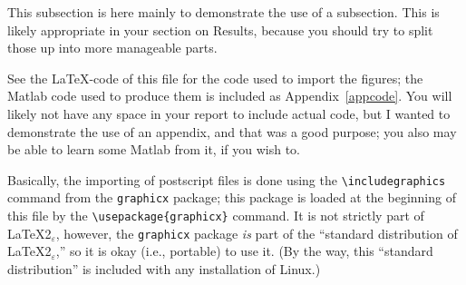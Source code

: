 \documentclass[12pt]{article}
\numberwithin{equation}{section}
\numberwithin{table}{section}
\numberwithin{figure}{section}
\begin{document}
This subsection is here mainly to demonstrate the use of a subsection.
This is likely appropriate in your section on Results, because you should
try to split those up into more manageable parts.

See the \LaTeX-code of this file for the code used to import the figures;
the Matlab code used to produce them is included as Appendix~\ref{appcode}.
You will likely not have any space in your report to include actual code, but
I wanted to demonstrate the use of an appendix, and that was a good purpose;
you also may be able to learn some Matlab from it, if you wish to.

Basically, the importing of postscript files is done using the
\verb+\includegraphics+ command from the \verb+graphicx+ package;
this package is loaded at the beginning of this file by
the \verb+\usepackage{graphicx}+ command.
It is not strictly part of \LaTeX2$_\varepsilon$,
however, the \verb+graphicx+ package \emph{is}
part of the ``standard distribution of \LaTeX2$_\varepsilon$,'' so it is
okay (i.e., portable) to use it. (By the way, this ``standard distribution''
is included with any installation of Linux.)
\end{document}
